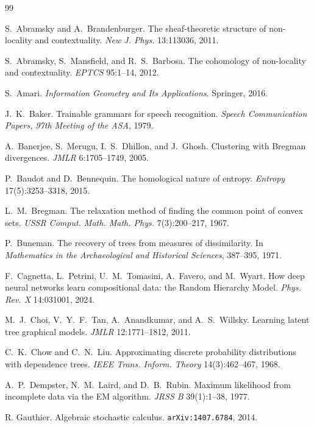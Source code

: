\documentclass[11pt,a4paper]{article}
\theoremstyle{plain}
\theoremstyle{definition}
\begin{document}
\begin{thebibliography}{99}

 S.~Abramsky and A.~Brandenburger.
  The sheaf-theoretic structure of non-locality and contextuality.
  \emph{New J. Phys.} 13:113036, 2011.

 S.~Abramsky, S.~Mansfield, and R.~S.~Barbosa.
  The cohomology of non-locality and contextuality.
  \emph{EPTCS} 95:1--14, 2012.

 S.~Amari. \emph{Information Geometry and Its
  Applications}. Springer, 2016.

 J.~K.~Baker. Trainable grammars for speech recognition.
  \emph{Speech Communication Papers, 97th Meeting of the ASA}, 1979.

 A.~Banerjee, S.~Merugu, I.~S.~Dhillon, and J.~Ghosh.
  Clustering with Bregman divergences. \emph{JMLR} 6:1705--1749, 2005.

 P.~Baudot and D.~Bennequin. The homological nature of entropy.
  \emph{Entropy} 17(5):3253--3318, 2015.

 L.~M.~Bregman. The relaxation method of finding the
  common point of convex sets. \emph{USSR Comput. Math. Math. Phys.}
  7(3):200--217, 1967.

 P.~Buneman. The recovery of trees from measures of
  dissimilarity. In \emph{Mathematics in the Archaeological and Historical
  Sciences}, 387--395, 1971.

 F.~Cagnetta, L.~Petrini, U.~M.~Tomasini, A.~Favero, and
  M.~Wyart. How deep neural networks learn compositional data: the Random
  Hierarchy Model. \emph{Phys. Rev. X} 14:031001, 2024.

 M.~J.~Choi, V.~Y.~F.~Tan, A.~Anandkumar, and A.~S.~Willsky.
  Learning latent tree graphical models. \emph{JMLR} 12:1771--1812, 2011.

 C.~K.~Chow and C.~N.~Liu. Approximating discrete
  probability distributions with dependence trees. \emph{IEEE Trans. Inform.
  Theory} 14(3):462--467, 1968.

 A.~P.~Dempster, N.~M.~Laird, and D.~B.~Rubin. Maximum
  likelihood from incomplete data via the EM algorithm. \emph{JRSS B}
  39(1):1--38, 1977.

 R. Gauthier. Algebraic stochastic calculus.
  \texttt{arXiv:1407.6784}, 2014.


\end{thebibliography}
\end{document}
